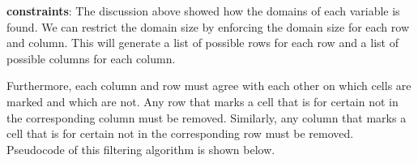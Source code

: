 \noindent
\textbf{constraints}: The discussion above showed how the domains of each
variable is found. We can restrict the domain size by enforcing the domain
size for each row and column.  This will generate a list of possible rows for
each row and a list of possible columns for each column.

Furthermore, each column and row must agree with each other on which cells are marked
and which are not. Any row that marks a cell that is for certain not in the
corresponding column must be removed. Similarly, any column that marks a cell
that is for certain not in the corresponding row must be removed. Pseudocode
of this filtering algorithm is shown below.\\

% 
% 
% 
% 
% 
% 
% 
% 
% 
% 
